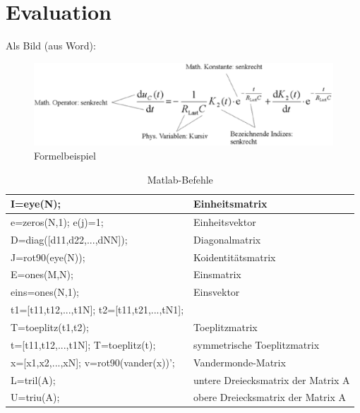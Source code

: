 \chapter[Evaluation]{Evaluation} 
\label{chap:Eval}


Als Bild (aus Word):
\begin{figure}[!htbp]
			\begin{center}
				\includegraphics[scale=0.6]{5_Evaluation/formelbeispiel.eps}
				\caption{Formelbeispiel}
				\label{chap2:formelbeispiel}
  		\end{center}
\end{figure}


\begin{table}[!ht]
\caption[In Matlab]{Matlab-Befehle}
\label{tab:ML1}
\begin{tabular}{|| p{7cm} | p{6cm} ||} \hline\hline
I=eye(N);      																									& Einheitsmatrix \\ \hline
e=zeros(N,1); e(j)=1; 																					& Einheitsvektor\\ \hline
D=diag([d11,d22,...,dNN]); 																			& Diagonalmatrix \\ \hline
J=rot90(eye(N)); 																								& Koidentitätsmatrix \\ \hline
E=ones(M,N); 																										& Einsmatrix \\ \hline
eins=ones(N,1); 																								& Einsvektor \\ \hline
t1=[t11,t12,...,t1N]; t2=[t11,t21,...,tN1]; 										& \\
T=toeplitz(t1,t2);  																						& Toeplitzmatrix \\ \hline
t=[t11,t12,...,t1N]; T=toeplitz(t); 														& symmetrische Toeplitzmatrix \\ \hline
x=[x1,x2,...,xN]; v=rot90(vander(x))'; 													& Vandermonde-Matrix \\ \hline
L=tril(A); 																											& untere Dreiecksmatrix der Matrix A \\ \hline
U=triu(A); 																											& obere Dreiecksmatrix der Matrix A \\ \hline\hline
\end{tabular}
\end{table}